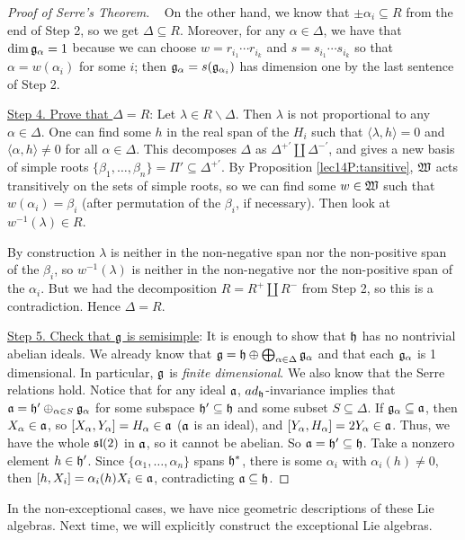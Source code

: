 \begin{proof}[Proof of Serre's Theorem]{\ }
 On the other hand, we know that $\pm \alpha_i \subseteq R$ from the end of Step 2, so
 we get $\Delta\subseteq R$. Moreover, for any $\alpha\in \Delta$, we have that $\dim
 \g_\alpha = 1$ because we can choose $w=r_{i_1}\cdots r_{i_k}$ and $s=s_{i_1}\cdots
 s_{i_k}$ so that $\alpha = w(\alpha_i)$ for some $i$; then $\g_\alpha =
 s(\g_{\alpha_i})$ has dimension one by the last sentence of Step 2.

 \underline{Step 4. Prove that $\Delta=R$}: Let $\lambda\in R\smallsetminus \Delta$.
 Then $\lambda$ is not proportional to any $\alpha\in \Delta$. One can find some $h$
 in the real span of the $H_i$ such that $\langle \lambda, h\rangle =0$ and $\langle
 \alpha, h\rangle \neq 0$ for all $\alpha\in \Delta$. This decomposes $\Delta$ as
 $\Delta^{+'}\coprod \Delta^{-'}$, and gives a new basis of simple roots
 $\{\beta_1,\dots, \beta_n\} = \Pi'\subseteq \Delta^{+'}$. By Proposition
 \ref{lec14P:tansitive}, $\weyl$ acts transitively on the sets of simple roots, so we can
 find some $w\in \weyl$ such that $w(\alpha_i)=\beta_i$ (after permutation of the
 $\beta_i$, if necessary). Then look at $w^{-1}(\lambda)\in R$.

 By construction $\lambda$ is neither in the non-negative span nor the non-positive
 span of the $\beta_i$, so $w^{-1}(\lambda)$ is neither in the non-negative nor the
 non-positive span of the $\alpha_i$. But we had the decomposition $R = R^+ \coprod
 R^-$ from Step 2, so this is a contradiction. Hence $\Delta = R$.

 \underline{Step 5. Check that $\g$ is semisimple}: It is enough to show that $\h$ has
 no nontrivial abelian ideals. We already know that $\g = \h\oplus
 \bigoplus_{\alpha\in \Delta} \g_\alpha$ and that each $\g_\alpha$ is 1 dimensional.
 In particular, $\g$ is \emph{finite dimensional}. We also know that the Serre
 relations hold. Notice that for any ideal $\a$, $ad_\h$-invariance implies that $\a =
 \h'\oplus_{\alpha \in S} \g_\alpha$ for some subspace $\h'\subseteq \h$ and some
 subset $S\subseteq \Delta$. If $\g_\alpha\subseteq \a$, then $X_\alpha\in \a$, so
 $[X_\alpha,Y_\alpha]=H_\alpha\in \a$ ($\a$ is an ideal), and
 $[Y_\alpha,H_\alpha]=2Y_\alpha\in \a$. Thus, we have the whole $\sl(2)$ in $\a$, so
 it cannot be abelian. So $\a = \h'\subseteq \h$. Take a nonzero element $h\in \h'$.
 Since $\{\alpha_1,\dots, \alpha_n\}$ spans $\h^*$, there is some $\alpha_i$ with
 $\alpha_i(h)\neq 0$, then $[h,X_i]=\alpha_i(h)X_i\in \a$, contradicting $\a\subseteq
 \h$.
 \end{proof}

 In the non-exceptional cases, we have nice geometric descriptions of these Lie
 algebras. Next time, we will explicitly construct the exceptional Lie algebras.

